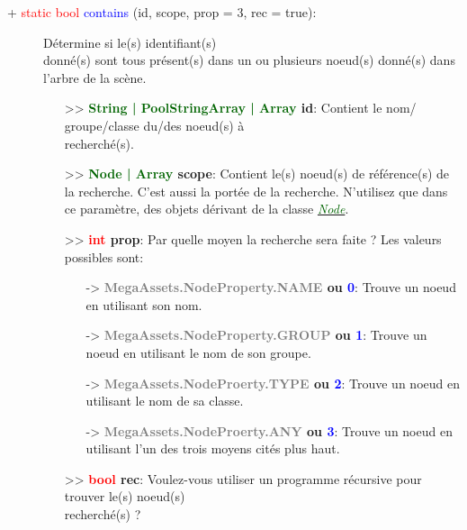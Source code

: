 \documentclass[a4paper, 11pt]{article}
\begin{document}
	\begin{description}
		\item [+ \textcolor{red}{static bool} \textcolor{blue}{contains} (id, scope, prop = 3, rec = true):] 
		Détermine si le(s) identifiant(s) \\donné(s) sont tous présent(s) dans un ou plusieurs noeud(s)
		donné(s) dans l'arbre de la scène.
		\begin{itemize}
			\item [>> \textbf{\textcolor{darkgreen}{String | PoolStringArray | Array} id}:] Contient le nom/
			groupe/classe du/des noeud(s) à \\recherché(s).
			\item [>> \textbf{\textcolor{darkgreen}{Node | Array} scope}:] Contient le(s) noeud(s) de
			référence(s) de la recherche. C'est aussi la portée de la recherche. N'utilisez que dans ce 
			paramètre, des objets dérivant de la classe
			\href{https://docs.godotengine.org/fr/stable/classes/class_node.html}
			{\textit{\textcolor{darkgreen}{Node}}}.
			\item [>> \textbf{\textcolor{red}{int} prop}:] Par quelle moyen la recherche sera faite ? Les 
			valeurs possibles sont:
			\begin{itemize}
				\item [-> \textbf{\textcolor{gray}{MegaAssets.NodeProperty.NAME} ou \textcolor{blue}{0}}:] 
				Trouve un noeud en utilisant son nom.
				\item [-> \textbf{\textcolor{gray}{MegaAssets.NodeProperty.GROUP} ou \textcolor{blue}{1}}:] 
				Trouve un noeud en utilisant le nom de son groupe.
				\item [-> \textbf{\textcolor{gray}{MegaAssets.NodeProerty.TYPE} ou \textcolor{blue}{2}}:] 
				Trouve un noeud en utilisant le nom de sa classe.
				\item [-> \textbf{\textcolor{gray}{MegaAssets.NodeProerty.ANY} ou \textcolor{blue}{3}}:] 
				Trouve un noeud en utilisant l'un des trois moyens cités plus haut.
			\end{itemize}
			\item [>> \textbf{\textcolor{red}{bool} rec}:] Voulez-vous utiliser un programme récursive pour 
			trouver le(s) noeud(s) \\recherché(s) ?\\
		\end{itemize}
	\end{description}
\end{document}
